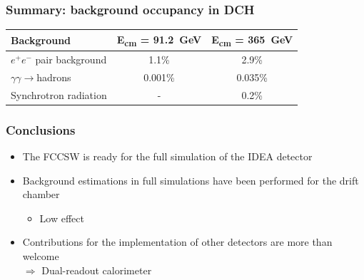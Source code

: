\documentclass[hyperref={colorlinks=true,pdfpagelabels=false,linkcolor=black}, xcolor=dvipsnames,10pt]{beamer}
\begin{document}
\begin{frame}
	\frametitle{Summary: background occupancy in DCH}

  \centering
  \begin{tabular}{l c c}
    \toprule
    Background & E\textsubscript{cm} = 91.2~GeV &  E\textsubscript{cm} = 365~GeV \\
    \midrule
    $e^+e^-$ pair background & 1.1\% & 2.9\% \\
    $\gamma\gamma\rightarrow$hadrons & 0.001\% & 0.035\%  \\
    Synchrotron radiation & - & 0.2\% \\
    \bottomrule
  \end{tabular}
\end{frame}

\label{lastslide}
\begin{frame}
	\frametitle{Conclusions}

  \begin{itemize}
    \item The FCCSW is ready for the full simulation of the IDEA detector
    \item Background estimations in full simulations have been performed for the drift chamber
    \begin{itemize}
      \item Low effect
    \end{itemize}
    \item Contributions for the implementation of other detectors are more than welcome \\ $\Rightarrow$ Dual-readout calorimeter
  \end{itemize}

\end{frame}


\end{document}
